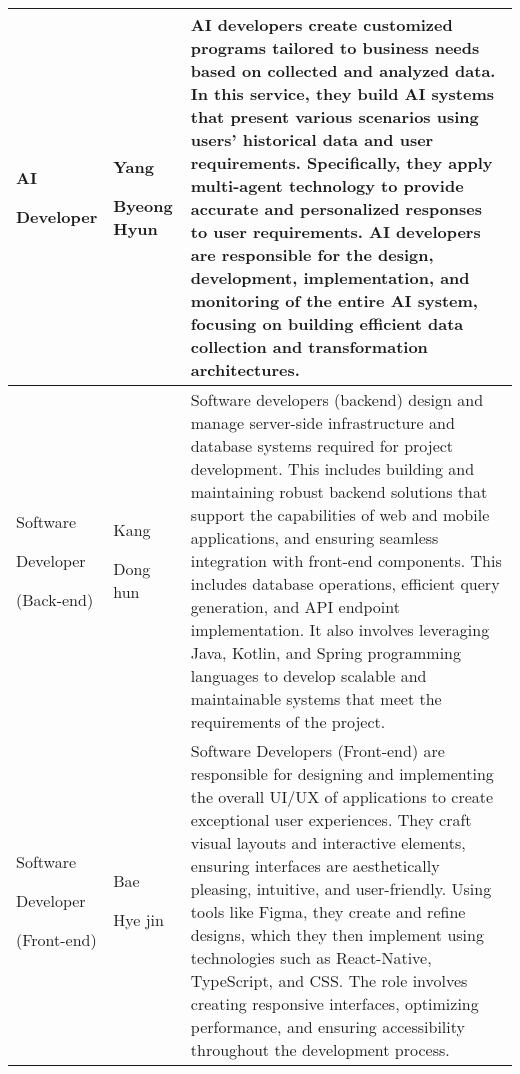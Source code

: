 \documentclass[conference]{IEEEtran}
\begin{document}
\begin{table}
\def\arraystretch{1.24} \small 

\begin{tabular}{|p{1.5cm}|p{1.2cm}|p{4.9cm}|}
    \hline
    AI \par Developer & Yang \par Byeong Hyun & AI developers create customized programs tailored to business needs based on collected and analyzed data. In this service, they build AI systems that present various scenarios using users' historical data and user requirements. Specifically, they apply multi-agent technology to provide accurate and personalized responses to user requirements. AI developers are responsible for the design, development, implementation, and monitoring of the entire AI system, focusing on building efficient data collection and transformation architectures.  \\ 
    \hline
    Software \par Developer \par(Back-end) & Kang \par Dong hun & Software developers (backend) design and manage server-side infrastructure and database systems required for project development. This includes building and maintaining robust backend solutions that support the capabilities of web and mobile applications, and ensuring seamless integration with front-end components. This includes database operations, efficient query generation, and API endpoint implementation. It also involves leveraging Java, Kotlin, and Spring programming languages to develop scalable and maintainable systems that meet the requirements of the project. \\ 
    \hline
    Software \par Developer\par(Front-end) & Bae \par Hye jin & Software Developers (Front-end) are responsible for designing and implementing the overall UI/UX of applications to create exceptional user experiences. They craft visual layouts and interactive elements, ensuring interfaces are aesthetically pleasing, intuitive, and user-friendly. Using tools like Figma, they create and refine designs, which they then implement using technologies such as React-Native, TypeScript, and CSS. The role involves creating responsive interfaces, optimizing performance, and ensuring accessibility throughout the development process.\\ 
    \hline
\end{tabular}
\end{table}
\end{document}
